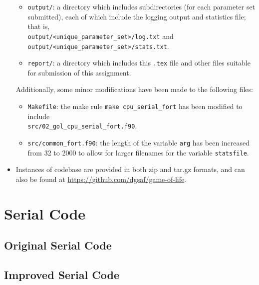 \documentclass[draft]{article}
\begin{document}
\begin{itemize}
\begin{itemize}
  \item \lstinline{output/}: a directory which includes subdirectories (for each
    parameter set submitted), each of which include the logging output and
    statistics file; that is, \\
    \lstinline{output/<unique_parameter_set>/log.txt} and \\
    \lstinline{output/<unique_parameter_set>/stats.txt}.

  \item \lstinline{report/}: a directory which includes this \lstinline{.tex}
    file and other files suitable for submission of this assignment.
  \end{itemize}

  Additionally, some minor modifications have been made to the following files:

  \begin{itemize}
  \item \lstinline{Makefile}: the make rule \lstinline{make cpu_serial_fort} has
    been modified to include \\ \lstinline{src/02_gol_cpu_serial_fort.f90}.

  \item \lstinline{src/common_fort.f90}: the length of the variable
    \lstinline[basicstyle=\ttfamily\color{blue}]{arg} has been increased from 32
    to 2000 to allow for larger filenames for the variable
    \lstinline[basicstyle=\ttfamily\color{blue}]{statsfile}.
  \end{itemize}

\item Instances of codebase are provided in both zip and tar.gz formats, and
  can also be found at \url{https://github.com/dgsaf/game-of-life}.
\end{itemize}

\section{Serial Code}
\label{sec:serial-code}

\subsection{Original Serial Code}
\label{sec:original-serial-code}

\subsection{Improved Serial Code}
\label{sec:improved-serial-code}
\end{document}
